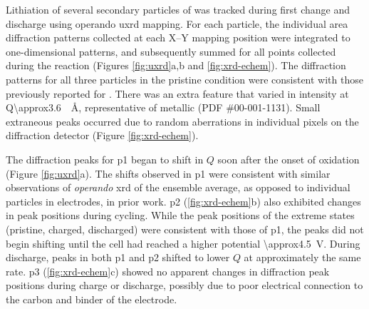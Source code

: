 \documentclass{article}
\begin{document}

Lithiation of several secondary particles of \nca{} was tracked during
first change and discharge using operando \gls{uxrd} mapping. For each
particle, the individual area diffraction patterns collected at each
X--Y mapping position were integrated to one-dimensional patterns, and
subsequently summed for all points collected during the reaction
(Figures \ref{fig:uxrd}a,b and \ref{fig:xrd-echem}). The diffraction
patterns for all three particles in the pristine condition were
consistent with those previously reported for \nca{}
\cite{novak2015}. There was an extra feature that varied in
intensity at Q\SI{\approx3.6}{\per\angstrom}, representative of
metallic  (PDF \#00-001-1131). Small extraneous peaks occurred
due to random aberrations in individual pixels on the diffraction
detector (Figure \ref{fig:xrd-echem}).

The diffraction peaks for \gls{p1} began to shift in $Q$ soon after
the onset of oxidation (Figure \ref{fig:uxrd}a). The shifts observed
in \gls{p1} were consistent with similar observations of
\emph{operando} \gls{xrd} of the ensemble average\cite{robert2015},
as opposed to individual particles in \nca{} electrodes, in prior
work\cite{grenier2017}. \gls{p2} (\ref{fig:xrd-echem}b) also
exhibited changes in peak positions during cycling. While the peak
positions of the extreme states (pristine, charged, discharged) were
consistent with those of \gls{p1}, the peaks did not begin shifting
until the cell had reached a higher potential
\SI{\approx4.5}{\volt}. During discharge, peaks in both \gls{p1} and
\gls{p2} shifted to lower $Q$ at approximately the same rate. \gls{p3}
(\ref{fig:xrd-echem}c) showed no apparent changes in diffraction peak
positions during charge or discharge, possibly due to poor electrical
connection to the carbon and binder of the electrode.
\end{document}
